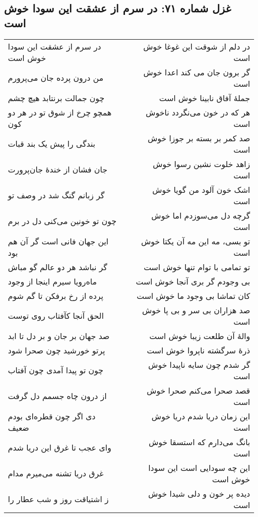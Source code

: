 \begin{center}
\section*{غزل شماره ۷۱: در سرم از عشقت این سودا خوش است}
\label{sec:071}
\begin{longtable}{l p{0.5cm} r}
در سرم از عشقت این سودا خوش است
&&
در دلم از شوقت این غوغا خوش است
\\
من درون پرده جان می‌پرورم
&&
گر برون جان می کند اعدا خوش است
\\
چون جمالت برنتابد هیچ چشم
&&
جملهٔ آفاق نابینا خوش است
\\
همچو چرخ از شوق تو در هر دو کون
&&
هر که در خون می‌نگردد ناخوش است
\\
بندگی را پیش یک بند قبات
&&
صد کمر بر بسته بر جوزا خوش است
\\
جان فشان از خندهٔ جان‌پرورت
&&
زاهد خلوت نشین رسوا خوش است
\\
گر زبانم گنگ شد در وصف تو
&&
اشک خون آلود من گویا خوش است
\\
چون تو خونین می‌کنی دل در برم
&&
گرچه دل می‌سوزدم اما خوش است
\\
این جهان فانی است گر آن هم بود
&&
تو بسی، مه این مه آن یکتا خوش است
\\
گر نباشد هر دو عالم گو مباش
&&
تو تمامی با توام تنها خوش است
\\
ماه‌رویا سیرم اینجا از وجود
&&
بی وجودم گر بری آنجا خوش است
\\
پرده از رخ برفکن تا گم شوم
&&
کان تماشا بی وجود ما خوش است
\\
الحق آنجا کآفتاب روی توست
&&
صد هزاران بی سر و بی پا خوش است
\\
صد جهان بر جان و بر دل تا ابد
&&
والهٔ آن طلعت زیبا خوش است
\\
پرتو خورشید چون صحرا شود
&&
ذرهٔ سرگشته ناپروا خوش است
\\
چون تو پیدا آمدی چون آفتاب
&&
گر شدم چون سایه ناپیدا خوش است
\\
از درون چاه جسمم دل گرفت
&&
قصد صحرا می‌کنم صحرا خوش است
\\
دی اگر چون قطره‌ای بودم ضعیف
&&
این زمان دریا شدم دریا خوش است
\\
وای عجب تا غرق این دریا شدم
&&
بانگ می‌دارم که استسقا خوش است
\\
غرق دریا تشنه می‌میرم مدام
&&
این چه سودایی است این سودا خوش است
\\
ز اشتیاقت روز و شب عطار را
&&
دیده پر خون و دلی شیدا خوش است
\\
\end{longtable}
\end{center}
